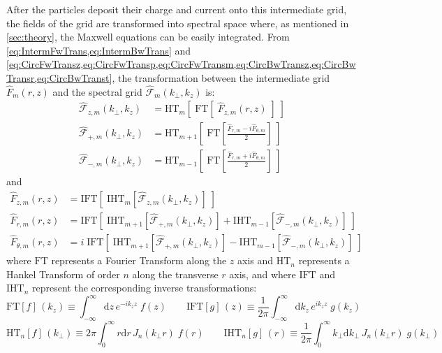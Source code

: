 \documentclass[1p,times,authoryear]{elsarticle}
\newcommand{\Integ}[1]{\int_{-\infty}^{\infty} \!\!\!\!\!\!
  \mathrm{d}#1}
\newcommand{\RInteg}[1]{\int_{0}^{\infty} \!\!\!\!\! #1\mathrm{d}#1}
\newcommand{\spectral}[1]{\hat{\mathcal{#1}}}
\begin{document}
After the particles deposit their charge and current onto this
intermediate grid, the fields of the grid are transformed into spectral
space where, as mentioned in \cref{sec:theory}, the Maxwell equations 
can be easily integrated. From \cref{eq:IntermFwTrans,eq:IntermBwTrans} and
\cref{eq:CircFwTransz,eq:CircFwTransp,eq:CircFwTransm,eq:CircBwTransz,eq:CircBwTransr,eq:CircBwTranst}, 
the transformation between the intermediate grid $\hat{F}_{m}(r,z)$
and the spectral grid $\spectral{F}_m(k_\perp, k_z)$ is:
\begin{align}
\spectral{F}_{z,m}(k_\perp,k_z) & = \mathrm{HT}_{m} [ \; \mathrm{FT}
                               [ \; \hat{F}_{z,m}(r,z) \; ] \;] \\
\spectral{F}_{+,m}(k_\perp,k_z) &= \mathrm{HT}_{m+1}\left[ \; \mathrm{FT} \left[ \frac{
  \hat{F}_{r,m} -i  \hat{F}_{\theta,m} }{2}  \right] \;\right] \\
\spectral{F}_{-,m}(k_\perp,k_z) &= \mathrm{HT}_{m-1} \left[ \;\mathrm{FT} \left[ \frac{
  \hat{F}_{r,m} +i  \hat{F}_{\theta,m} }{2}  \right] \;\right] 
\end{align}
and
\begin{align}
\hat{F}_{z,m}(r,z) &= \mathrm{IFT} [\; \mathrm{IHT}_{m} [
                         \spectral{F}_{z,m}(k_\perp,k_z) ] \; ] \\
\hat{F}_{r,m}(r,z) & = \mathrm{IFT} \left[ \; \mathrm{IHT}_{m+1}
                         [ \spectral{F}_{+,m}(k_\perp,k_z) ] + \mathrm{IHT}_{m-1} [
                         \spectral{F}_{-,m}(k_\perp,k_z) ] \; \right] \label{eq:FTHTr}\\
\hat{F}_{\theta,m}(r,z) & = i\;\mathrm{IFT} \left[ \; \mathrm{IHT}_{m+1}
                         [ \spectral{F}_{+,m}(k_\perp,k_z) ] -
                          \mathrm{IHT}_{m-1} [
                          \spectral{F}_{-,m}(k_\perp,k_z) ] \; \right]
\label{eq:FTHTt}
\end{align}
where $\mathrm{FT}$ represents a Fourier Transform along the $z$
axis and $\mathrm{HT}_{n}$ represents a Hankel Transform of order
$n$ along the transverse $r$ axis, and where $\mathrm{IFT}$ and
$\mathrm{IHT}_{n}$ represent the corresponding inverse
transformations:
\begin{equation} 
\mathrm{FT} [f]\, (k_z) \equiv \Integ{z} \, e^{-ik_zz} \; f(z) \qquad 
\mathrm{IFT} [g] \,(z)\equiv \frac{1}{2\pi}\Integ{k_z} \, e^{ik_zz} \;
g(k_z)
\end{equation}
\begin{equation}
\label{eq:def-Hankel} 
\mathrm{HT}_{n} [f]\,(k_\perp) \equiv 2\pi \RInteg{r} \,
J_{n}(k_\perp r) \; f(r) \qquad 
\mathrm{IHT}_{n} [g]\,(r) \equiv \frac{1}{2\pi}\RInteg{k_\perp} \,
J_{n}(k_\perp r)  \;  g(k_\perp) 
\end{equation}
\end{document}
